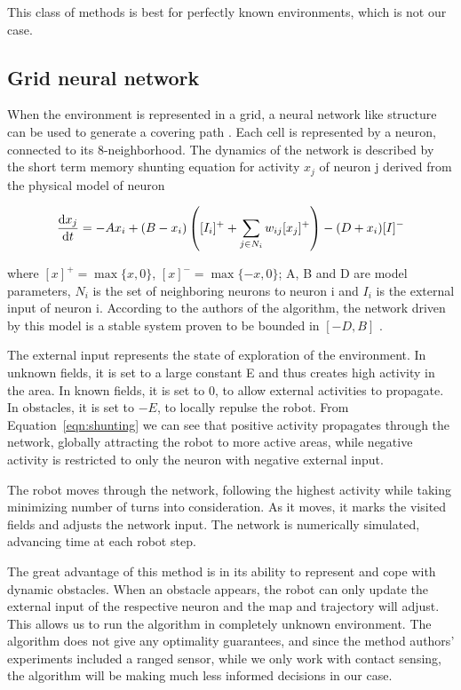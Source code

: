\documentclass[buriama8_dp.tex]{subfiles}
\begin{document}
This class of methods is best for perfectly known environments, which is not our case.


\subsection{Grid neural network}
\label{subsec:nncpp}
When the environment is represented in a grid, a neural network like structure can be used to generate a covering path \cite{neural}. Each cell is represented by a neuron, connected to its 8-neighborhood. The dynamics of the network is described by the short term memory shunting equation for activity \(x_j\) of neuron \m j derived from the physical model of neuron \cite[sec.~III]{neural}
 
\begin{equation}
  \frac{\textrm{d} x_j}{\textrm{d} t} = -Ax_i + (B-x_i) \left( [I_i]^+ + \sum_{j \in N_i} w_{ij}[x_j]^+ \right) - (D+x_i)[I]^-
\label{eqn:shunting}
\end{equation}

\noindent where \([x]^+=\max\{x,0\}\), \([x]^-=\max\{-x,0\}\); \m A, \m B and \m D are model parameters, \(N_i\) is the set of neighboring neurons to neuron \m i and \(I_i\) is the external input of neuron \m i. According to the authors of the algorithm, the network driven by this model is a stable system proven to be bounded in \([-D,B]\) \cite{grossbergmodel}.

The external input represents the state of exploration of the environment. In unknown fields, it is set to a large constant \m E and thus creates high activity in the area. In known fields, it is set to 0, to allow external activities to propagate. In obstacles, it is set to \(-E\), to locally repulse the robot. From Equation~\ref{eqn:shunting} we can see that positive activity propagates through the network, globally attracting the robot to more active areas, while negative activity is restricted to only the neuron with negative external input.

The robot moves through the network, following the highest activity while taking minimizing number of turns into consideration. As it moves, it marks the visited fields and adjusts the network input. The network is numerically simulated, advancing time at each robot step.

The great advantage of this method is in its ability to represent and cope with dynamic obstacles. When an obstacle appears, the robot can only update the external input of the respective neuron and the map and trajectory will adjust. This allows us to run the algorithm in completely unknown environment. The algorithm does not give any optimality guarantees, and since the method authors' experiments included a ranged sensor, while we only work with contact sensing, the algorithm will be making much less informed decisions in our case.
\end{document}
